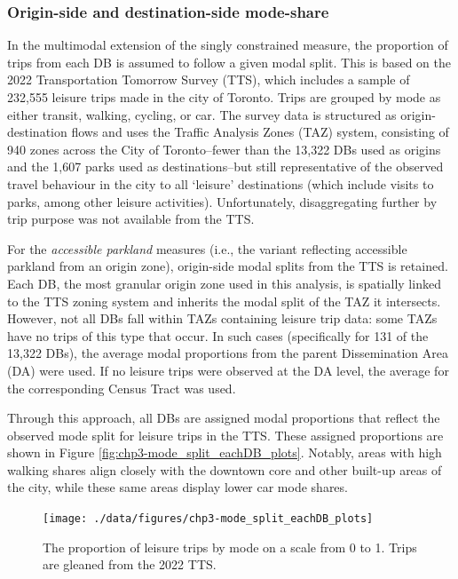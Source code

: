 \documentclass[
11pt, %
oneside, %
english, %
singlespacing, %
]{macthesis} %
\begin{document}
\subsubsection{Origin-side and destination-side mode-share}\label{origin-side-and-destination-side-mode-share}

In the multimodal extension of the singly constrained measure, the proportion of trips from each DB is assumed to follow a given modal split. This is based on the 2022 Transportation Tomorrow Survey (TTS), which includes a sample of 232,555 leisure trips made in the city of Toronto. Trips are grouped by mode as either transit, walking, cycling, or car. The survey data is structured as origin-destination flows and uses the Traffic Analysis Zones (TAZ) system, consisting of 940 zones across the City of Toronto--fewer than the 13,322 DBs used as origins and the 1,607 parks used as destinations--but still representative of the observed travel behaviour in the city to all `leisure' destinations (which include visits to parks, among other leisure activities). Unfortunately, disaggregating further by trip purpose was not available from the TTS.

For the \emph{accessible parkland} measures (i.e., the variant reflecting accessible parkland from an origin zone), origin-side modal splits from the TTS is retained. Each DB, the most granular origin zone used in this analysis, is spatially linked to the TTS zoning system and inherits the modal split of the TAZ it intersects. However, not all DBs fall within TAZs containing leisure trip data: some TAZs have no trips of this type that occur. In such cases (specifically for 131 of the 13,322 DBs), the average modal proportions from the parent Dissemination Area (DA) were used. If no leisure trips were observed at the DA level, the average for the corresponding Census Tract was used.

Through this approach, all DBs are assigned modal proportions that reflect the observed mode split for leisure trips in the TTS. These assigned proportions are shown in Figure \ref{fig:chp3-mode_split_eachDB_plots}. Notably, areas with high walking shares align closely with the downtown core and other built-up areas of the city, while these same areas display lower car mode shares.

\begin{figure}

{\centering \texttt{[image: ./data/figures/chp3-mode\_split\_eachDB\_plots]} 

}

\caption{\label{fig:chp3-mode_split_eachDB_plots}  The proportion of leisure trips by mode on a scale from 0 to 1. Trips are gleaned from the 2022 TTS. }\label{fig:unnamed-chunk-51}
\end{figure}
\end{document}
